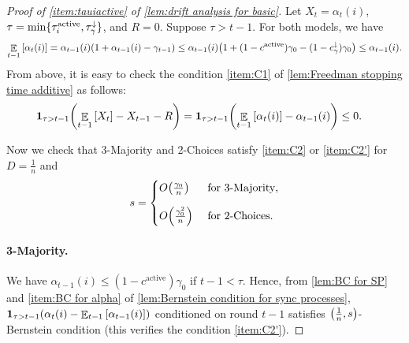 \documentclass[letterpaper,11pt]{article}
\DeclarePairedDelimiter{\cbra}{\lbrace}{\rbrace} %
\newcommand{\indicator}{\mathbf{1}}
\DeclareMathOperator*{\E}{\mathbb{E}}
\newcommand{\alphanorm}{\gamma}
\newcommand{\bounded}{D}
\newcommand{\variance}{s}
\newcommand{\taunormdown}{\tau^{\downarrow}_\alphanorm}
\newcommand{\tauincreasei}{\tau^{\mathrm{active}}_i}
\newcommand{\cnormdown}{c^{\downarrow}_\alphanorm}
\newcommand{\cactive}{c^{\mathrm{active}}}
\newcommand{\drift}{R}
\begin{document}
\begin{proof}[Proof of \cref{item:tauiactive} of \cref{lem:drift analysis for basic}]
    Let $X_t=\alpha_t(i)$,
    $\tau=\min\cbra{\tauincreasei,\taunormdown}$, and $\drift=0$.
    Suppose $\tau>t-1$.
    For both models, we have
    \begin{align*}
    \E_{t-1}\qty[\alpha_t(i)]
    =\alpha_{t-1}(i)\qty(1+\alpha_{t-1}(i)-\alphanorm_{t-1})
    \leq \alpha_{t-1}(i)\qty(1+(1-\cactive)\alphanorm_{0}-(1-\cnormdown)\alphanorm_{0})
    \leq \alpha_{t-1}(i).
    \end{align*}
    From above, it is easy to check the condition \ref{item:C1} of \cref{lem:Freedman stopping time additive} as follows:
    \begin{align*}
        \indicator_{\tau>t-1}\qty(\E_{t-1}\qty[ X_t ]-X_{t-1}-R)
        &=\indicator_{\tau>t-1}\qty(\E_{t-1}\qty[ \alpha_t(i) ]-\alpha_{t-1}(i))
        \leq 0.
    \end{align*}

    Now we check that 3-Majority and 2-Choices satisfy \ref{item:C2} or \ref{item:C2'} for $\bounded = \frac{1}{n}$ and
        \begin{align} 
       s = \begin{cases}
        O\qty( \frac{\alphanorm_0}{n} )	& \text{ for 3-Majority},\\[10pt]
        O\qty( \frac{\alphanorm_0^2}{n} ) & \text{ for 2-Choices}.
       \end{cases} \label{def:variance alphaactive}
    \end{align}

    \paragraph*{3-Majority.}
    We have $\alpha_{t-1}(i)\leq (1-\cactive)\alphanorm_0$ if $ t-1 < \tau $.
    Hence, from \cref{lem:BC for SP} and \cref{item:BC for alpha} of \cref{lem:Bernstein condition for sync processes}, 
    $\indicator_{\tau>t-1}\qty(\alpha_t(i)-\E_{t-1}\qty[ \alpha_{t-1}(i)])$ conditioned on round $t-1$ satisfies $\qty(\frac{1}{n},\variance)$-Bernstein condition (this verifies the condition \ref{item:C2'}).
    


\end{proof}
\end{document}
